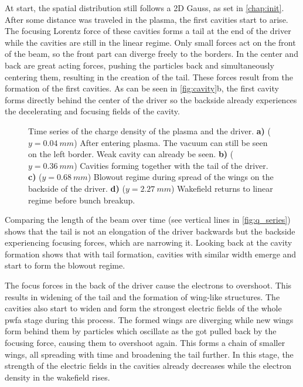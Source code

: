 \documentclass[bachelor_thesis]{subfiles}
\begin{document}
At start, the spatial distribution still follows a 2D Gauss, as set in \autoref{chap:init}. After some distance was traveled in the plasma, the first cavities start to arise. The focusing Lorentz force of these cavities forms a tail at the end of the driver while the cavities are still in the linear regime.
Only small forces act on the front of the beam, so the front part can diverge freely to the borders. In the center and back are great acting forces, pushing the particles back and simultaneously centering them, resulting in the creation of the tail.
These forces result from the formation of the first cavities. As can be seen in \autoref{fig:cavity}b, the first cavity forms directly behind the center of the driver so the backside already experiences the decelerating and focusing fields of the cavity.
\begin{figure}
	\centering
	\missingfigure{}
	\caption{Time series of the charge density of the plasma and the driver.
	\textbf{a)} ($y=\qty{0.04}{mm}$) After entering plasma. The vacuum can still be seen on the left border. Weak cavity can already be seen.
	\textbf{b)} ($y=\qty{0.36}{mm}$) Cavities forming together with the tail of the driver.
	\textbf{c)} ($y=\qty{0.68}{mm}$) Blowout regime during spread of the wings on the backside of the driver.
	\textbf{d)} ($y=\qty{2.27}{mm}$) Wakefield returns to linear regime before bunch breakup.}
	\label{fig:cavity}
\end{figure}
Comparing the length of the beam over time (see vertical lines in \autoref{fig:q_series}) shows that the tail is not an elongation of the driver backwards but the backside experiencing focusing forces, which are narrowing it.
Looking back at the cavity formation shows that with tail formation, cavities with similar width emerge and start to form the blowout regime.

The focus forces in the back of the driver cause the electrons to overshoot. This results in widening of the tail and the formation of wing-like structures. The cavities also start to widen and form the strongest electric fields of the whole \gls{pwfa} stage during this process.
The formed wings are diverging while new wings form behind them by particles which oscillate as the got pulled back by the focusing force, causing them to overshoot again. This forms a chain of smaller wings, all spreading with time and broadening the tail further.
In this stage, the strength of the electric fields in the cavities already decreases while the electron density in the wakefield rises.
\end{document}

